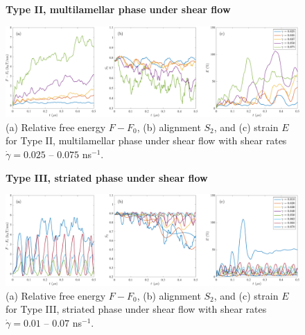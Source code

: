 \begin{figure}[h!]
\textbf{Type II, multilamellar phase under shear flow}\par\medskip
\begin{center}
\includegraphics[width=\textwidth]{SMFigures/MLShRaw.pdf}
\end{center}
\caption{(a) Relative free energy $F - F_0$, (b) alignment $S_2$, and
  (c) strain $E$ for Type II, multilamellar phase under shear flow with
  shear rates $\dot\gamma=0.025$ -- $0.075$ ns$^{-1}$.
}
\label{fig:mlshraw}
\end{figure}


\begin{figure}[h!]
\textbf{Type III, striated phase under shear flow}\par\medskip
\begin{center}
\includegraphics[width=\textwidth]{SMFigures/StShRaw.pdf}
\end{center}
\caption{(a) Relative free energy $F - F_0$, (b) alignment $S_2$, and
  (c) strain $E$ for Type III, striated phase under shear flow with
  shear rates $\dot\gamma=0.01$ -- $0.07$ ns$^{-1}$.
}
\label{fig:stshraw}
\end{figure}

